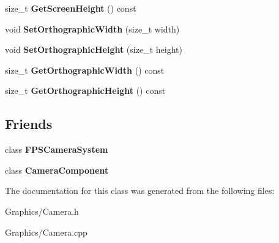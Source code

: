 \begin{DoxyCompactItemize}
size\+\_\+t {\bfseries Get\+Screen\+Height} () const
\item 
\mbox{\label{classCamera_aa4d72b13e178899c2bdb68652a8fd10a}} 
void {\bfseries Set\+Orthographic\+Width} (size\+\_\+t width)
\item 
\mbox{\label{classCamera_a59239b01b73f2e6aeb482b32831aba2b}} 
void {\bfseries Set\+Orthographic\+Height} (size\+\_\+t height)
\item 
\mbox{\label{classCamera_a247797f293fc7e2aa7529c3ad0ea4739}} 
size\+\_\+t {\bfseries Get\+Orthographic\+Width} () const
\item 
\mbox{\label{classCamera_a12110e195967b52900768e4e008c7d63}} 
size\+\_\+t {\bfseries Get\+Orthographic\+Height} () const
\end{DoxyCompactItemize}
\subsection*{Friends}
\begin{DoxyCompactItemize}
\item 
\mbox{\label{classCamera_ad7590dd71ff942ecb6f2926afddaafbe}} 
class {\bfseries F\+P\+S\+Camera\+System}
\item 
\mbox{\label{classCamera_ae834a5e62eff7d0adb1092a0693388f7}} 
class {\bfseries Camera\+Component}
\end{DoxyCompactItemize}


The documentation for this class was generated from the following files\+:\begin{DoxyCompactItemize}
\item 
Graphics/Camera.\+h\item 
Graphics/Camera.\+cpp\end{DoxyCompactItemize}
